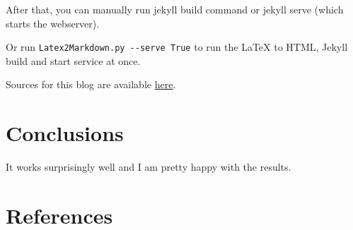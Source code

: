 \documentclass{article}
\begin{document}
After that, you can manually run jekyll build command or jekyll serve (which starts the webserver).

Or run \lstinline{Latex2Markdown.py --serve True} to run the LaTeX to HTML, Jekyll build and start service at once.

Sources for this blog are available \href{https://gabrielcarvfer.github.io/Latex2Markdown.py}{here}.

\section{Conclusions}\label{conclusions}
It works surprisingly well and I am pretty happy with the results.

\section{References}


\end{document}
